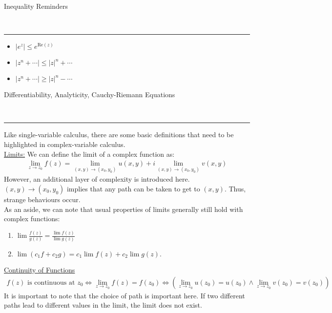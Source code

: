 \documentclass{article}
\newcommand{\header}[1]{\begin{large}\noindent #1\end{large}\\\rule{\textwidth}{0.5pt}}
\newcommand{\gap}{\medskip\\}
\newcommand{\sheader}[1]{\underline{#1:}}
\newcommand{\ds}{\displaystyle}
\begin{document}
    \pagebreak

    \header{Inequality Reminders}
    \begin{itemize}
        \item $|e^z| \leq e^{\text{Re}(z)}$
        \item $|z^n + \cdots | \leq |z|^n + \cdots $
        \item $|z^n + \cdots | \geq |z|^n - \cdots $
    \end{itemize}
    
    \header{Differentiability, Analyticity, Cauchy-Riemann Equations}
    Like single-variable calculus, there are some basic definitions that need to 
    be highlighted in complex-variable calculus.
    \gap
    \sheader{Limits}
    We can define the limit of a complex function as:
    \begin{align*}
        \lim_{z \to z_0} f(z) = \lim_{(x, y) \to (x_0, y_0)}u(x, y) + i \lim_{(x, y) \to (x_0, y_0)}v(x, y)
    \end{align*}
    However, an additional layer of complexity is introduced here. $(x, y) \to (x_0, y_0)$
    implies that any path can be taken to get to $(x,y)$. Thus, strange behaviours occur.
    \gap
    As an aside, we can note that usual properties of limits generally still hold 
    with complex functions:
    \begin{enumerate}
        \item $\ds \lim \frac{f(z)}{g(z)} = \frac{\lim f(z)}{\lim g(z)}$
        \item $\lim(c_1 f + c_2 g) = c_1 \lim f(z) + c_2 \lim g(z)$.
    \end{enumerate}
    \underline{Continuity of Functions}
    \begin{align*}
        f(z) \textrm{ is continuous at }z_0 \iff \lim_{z \to z_0} f(z) = f(z_0) \iff \left(\lim_{z \to z_0} u(z_0) = u(z_0) \wedge \lim_{z \to z_0} v(z_0) = v(z_0)\right)
    \end{align*}
    It is important to note that the choice of path is important here. 
    If two different paths lead to different values in the limit, the limit does not 
    exist.
    
\end{document}
